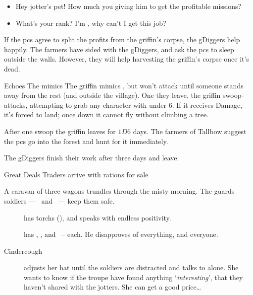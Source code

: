\documentclass[10pt,twoside]{book}
\begin{document}
\begin{itemize}\it
  \item
  Hey \gls{jotter}'s pet!
  How much you giving him to get the profitable missions?
  \item
  What's your rank?
  I'm , why can't I get this job?
\end{itemize}

If the \glspl{pc} agree to split the profits from the \gls{griffin}'s corpse, the \glspl{gDigger} help happily.
The farmers have sided with the \glspl{gDigger}, and ask the \glspl{pc} to sleep outside the walls.
However, they will help \gls{harvesting} the \gls{griffin}'s corpse once it's dead.

\begin{figure}[ht]
\end{figure}%

{Echoes}%
{The  mimics }%
The \gls{griffin} mimics , but won't attack until someone stands away from the rest (and outside the \gls{village}).
One they leave, the \gls{griffin} swoop-attacks, attempting to grab any character with  under 6.
If it receives Damage, it's forced to land; once down it cannot fly without climbing a tree.

After one swoop the \gls{griffin} leaves for $1D6$ days.
The farmers of Tallbow suggest the \glspl{pc} go into the forest and hunt for it immediately.

The \glspl{gDigger} finish their work after three days and leave.



{Great Deals}%
{Traders arrive with \glspl{ration} for sale}%

A caravan of three wagons trundles through the misty morning.
The \glspl{guard} \glspl{soldier} --- \composeHumanName\ and \composeHumanName\ --- keep them safe.

\begin{description}
  \item[\composeHumanName]
  has \glspl{torch} (), and speaks with endless positivity.
  \item[\composeHumanName]
  has \rations, \rations, and \rations\ --  each.
  He disapproves of everything, and everyone.
  \item[Cindercough]
  adjusts her hat until the \glspl{soldier} are distracted and talks to  alone.
  She wants to know if the troupe have found anything `\emph{interesting}', that they haven't shared with the \glspl{jotter}.
  She can get a good price\ldots
\end{description}
\end{document}
